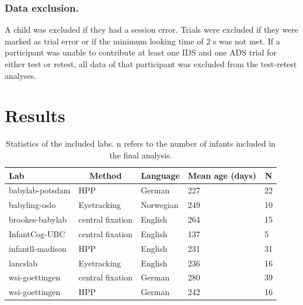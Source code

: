 \documentclass[
  english,
  man,floatsintext]{apa6}
\begin{document}
\hypertarget{data-exclusion.}{%
\subsubsection{Data exclusion.}\label{data-exclusion.}}

A child was excluded if they had a session error. Trials were excluded if they were marked as trial error or if the minimum looking time of 2 s was not met. If a participant was unable to contribute at least one IDS and one ADS trial for either test or retest, all data of that participant was excluded from the test-retest analyses.

\hypertarget{results}{%
\section{Results}\label{results}}

\begin{table}[tbp]

\begin{center}
\begin{threeparttable}

\caption{\label{tab:labs}Statistics of the included labs. n refers to the number of infants included in the final analysis.}

\begin{tabular}{lllll}
\toprule
Lab & \multicolumn{1}{c}{Method} & \multicolumn{1}{c}{Language} & \multicolumn{1}{c}{Mean age (days)} & \multicolumn{1}{c}{N}\\
\midrule
babylab-potsdam & HPP & German & 227 & 22\\
babyling-oslo & Eyetracking & Norwegian & 249 & 10\\
brookes-babylab & central fixation & English & 264 & 15\\
InfantCog-UBC & central fixation & English & 137 & 5\\
infantll-madison & HPP & English & 231 & 31\\
lancslab & Eyetracking & English & 236 & 16\\
wsi-goettingen & central fixation & German & 280 & 39\\
wsi-goettingen & HPP & German & 242 & 16\\
\bottomrule
\end{tabular}

\end{threeparttable}
\end{center}

\end{table}
\end{document}
